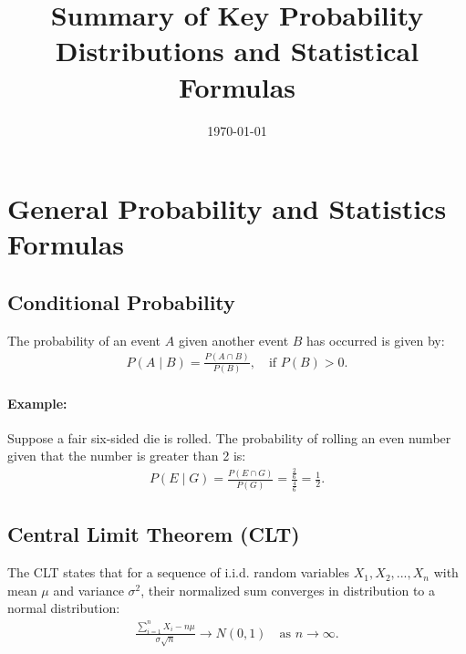 \documentclass[12pt]{article}
\title{Summary of Key Probability Distributions and Statistical Formulas}
\author{}
\date{\today}
\begin{document}
\maketitle

\tableofcontents
\newpage

\section{General Probability and Statistics Formulas}

\subsection{Conditional Probability}
The probability of an event $A$ given another event $B$ has occurred is given by:
\begin{align*}
    P(A \mid B) = \frac{P(A \cap B)}{P(B)}, \quad \text{if } P(B) > 0.
\end{align*}
\paragraph{Example:} Suppose a fair six-sided die is rolled. The probability of rolling an even number given that the number is greater than 2 is:
\begin{align*}
    P(E \mid G) = \frac{P(E \cap G)}{P(G)} = \frac{\frac{2}{6}}{\frac{4}{6}} = \frac{1}{2}.
\end{align*}

\subsection{Central Limit Theorem (CLT)}
The CLT states that for a sequence of i.i.d. random variables $X_1, X_2, ..., X_n$ with mean $\mu$ and variance $\sigma^2$, their normalized sum converges in distribution to a normal distribution:
\begin{align*}
    \frac{\sum_{i=1}^{n} X_i - n\mu}{\sigma \sqrt{n}} \to N(0,1) \quad \text{as } n \to \infty.
\end{align*}
\end{document}
